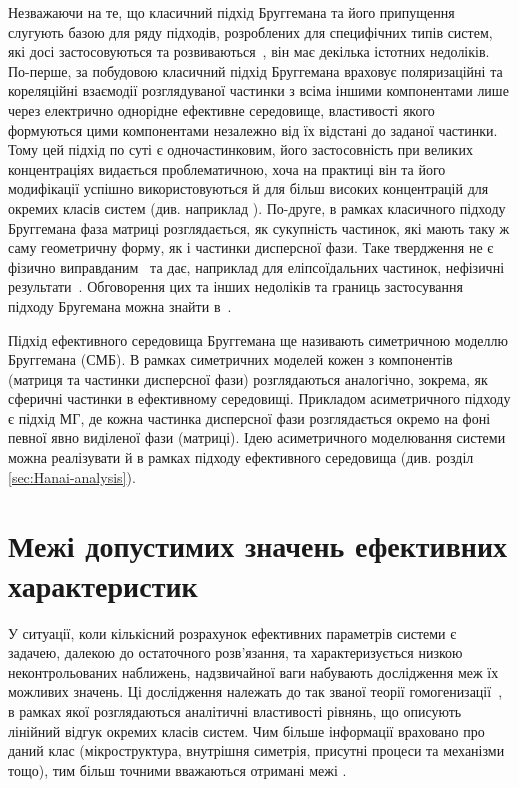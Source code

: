 \documentclass[14pt,twoside]{vakthesis}
\begin{document}
Незважаючи на те, що класичний підхід Бруггемана та його припущення слугують базою для ряду підходів, розроблених для специфічних типів систем, які досі застосовуються та розвиваються~\cite{Choy,Stroud1998,Milton,Banheg1986}, він має декілька істотних недоліків.
По-перше, за побудовою класичний підхід Бруггемана враховує поляризаційні та кореляційні взаємодії розглядуваної частинки з всіма іншими компонентами лише через електрично однорідне ефективне середовище, властивості якого формуються цими компонентами незалежно від їх відстані до заданої частинки. Тому цей підхід по суті є одночастинковим, його застосовність при великих концентраціях видається проблематичною, хоча на практиці він та його модифікації успішно використовуються й для більш високих концентрацій для окремих класів систем (див. наприклад \cite{Wiec1994, Zhou2012, McLachlan1990}).
По-друге, в рамках класичного підходу Бруггемана фаза матриці розглядається, як сукупність частинок, які мають таку ж саму геометричну форму, як і частинки дисперсної фази. Таке твердження не є фізично виправданим~\cite{Chelidze} та дає, наприклад для еліпсоїдальних частинок, нефізичні результати~\cite{Brouers1986,Kirkpatrick1971,Torquato}.
Обговорення цих та інших недоліків та границь застосування підходу Бругемана можна знайти в~\cite{Torquato,Choy,Sihvola1999,Brosseau2006,Milton}.

Підхід ефективного середовища Бруггемана ще називають симетричною моделлю Бруггемана (СМБ). В рамках симетричних моделей кожен з компонентів (матриця та частинки дисперсної фази) розглядаються аналогічно, зокрема, як сферичні частинки в ефективному середовищі. Прикладом асиметричного підходу є підхід МГ, де кожна частинка дисперсної фази розглядається окремо на фоні певної явно виділеної фази (матриці).
Ідею асиметричного моделювання системи можна реалізувати й в рамках підходу ефективного середовища (див. розділ \ref{sec:Hanai-analysis}).


\section{Межі допустимих значень ефективних характеристик}\label{sec:HS}

У ситуації, коли кількісний розрахунок  ефективних параметрів системи є задачею, далекою до остаточного розв'язання, та характеризується низкою неконтрольованих наближень, надзвичайної ваги набувають дослідження меж їх можливих значень.
Ці дослідження належать до так званої теорії гомогенизації~\cite{Torquato,Milton,Sihvola1999,Jikov}, в рамках  якої розглядаються аналітичні властивості рівнянь, що описують лінійний відгук окремих класів систем.
Чим більше інформації враховано про даний клас (мікроструктура, внутрішня симетрія, присутні процеси та механізми тощо), тим  більш точними вважаються отримані межі \cite{Cule1999,Torquato}.
\end{document}
